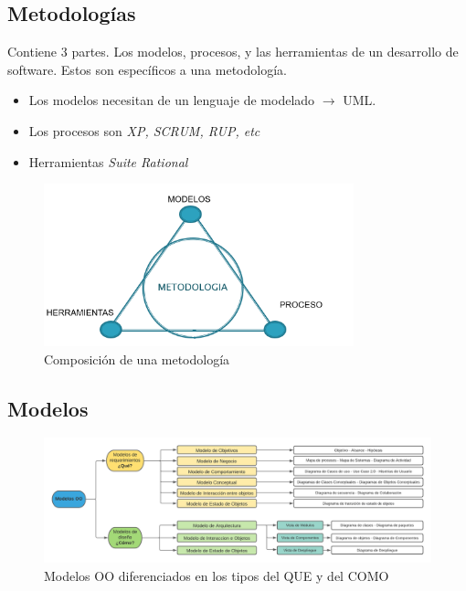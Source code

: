 \documentclass[titlepage,a4paper]{article}
\begin{document}
\subsection{Metodologías}
Contiene 3 partes. Los modelos, procesos, y las herramientas de un desarrollo de software. Estos son específicos a una metodología.

    \begin{itemize}
        \item Los modelos necesitan de un lenguaje de modelado $\rightarrow$ UML.
        \item Los procesos son \textit{XP, SCRUM, RUP, etc}
        \item Herramientas \textit{Suite Rational}
    \end{itemize}
    
    \begin{figure}[!htb]
        \centering
        \includegraphics[width=0.8\textwidth]{Imagenes/Metodologias.png}
        \caption{Composición de una metodología}
    \end{figure}

\subsection{Modelos}


\begin{figure}[!htb]
    \centering
    \hspace*{-2.8cm}
    \includegraphics[width=1.3\textwidth]{Imagenes/ModelosOO.png}
    \caption{Modelos OO diferenciados en los tipos del QUE y del COMO}
\end{figure}
\end{document}
